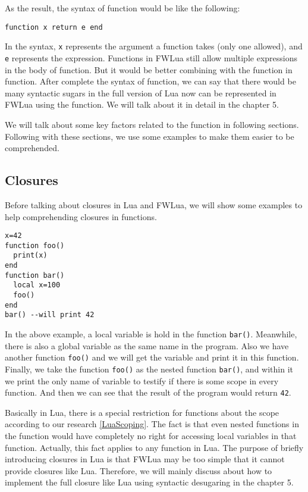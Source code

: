 As the result, the syntax of function would be like the following:
\begin{verbatim}
function x return e end
\end{verbatim}
In the syntax, {\tt x} represents the argument a function takes (only one allowed), and {\tt e} represents the expression. Functions in FWLua still allow multiple expressions in the body of function. But it would be better combining with the function in function. After complete the syntax of function, we can say that there would be many syntactic sugars in the full version of Lua now can be represented in FWLua using the function. We will talk about it in detail in the chapter 5. 

We will talk about some key factors related to the function in following sections. Following with these sections, we use some examples to make them easier to be comprehended.

\subsection{Closures}
Before talking about closures in Lua and FWLua, we will show some examples to help comprehending closures in functions.
\begin{verbatim}
x=42
function foo()
  print(x)
end
function bar()
  local x=100
  foo()
end
bar() --will print 42
\end{verbatim}
In the above example, a local variable is hold in the function {\tt bar()}. Meanwhile, there is also a global variable as the same name in the program. Also we have another function {\tt foo()} and we will get the variable and print it in this function. Finally, we take the function {\tt foo()} as the nested function {\tt bar()}, and within it we print the only name of variable to testify if there is some scope in every function. And then we can see that the result of the program would return {\tt 42}.

Basically in Lua, there is a special restriction for functions about the scope according to our research \ref{LuaScoping}. The fact is that even nested functions in the function would have completely no right for accessing local variables in that function. Actually, this fact applies to any function in Lua. The purpose of briefly introducing closures in Lua is that FWLua may be too simple that it cannot provide closures like Lua. Therefore, we will mainly discuss about how to implement the full closure like Lua using syntactic desugaring in the chapter 5. 


